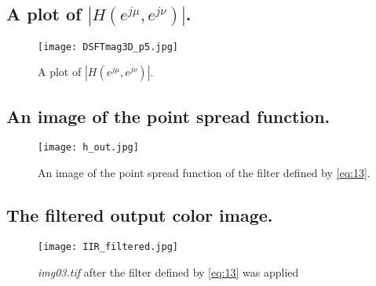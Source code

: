 \documentclass{article}
\begin{document}
\subsection{A plot of $|H(e^{j \mu}, e^{j \nu})|$.}
\begin{figure}[h]
    \centering
    \texttt{[image: DSFTmag3D\_p5.jpg]}
    \caption{A plot of $|H(e^{j \mu}, e^{j \nu})|$.}
    \label{fig:9}
\end{figure}
\newpage

\subsection{An image of the point spread function.}
\begin{figure}[h]
    \centering
    \texttt{[image: h\_out.jpg]}
    \caption{An image of the point spread function of the filter defined by \eqref{eq:13}.}
    \label{fig:9}
\end{figure}
\newpage
\subsection{The filtered output color image.}
\begin{figure}[h]
    \centering
    \texttt{[image: IIR\_filtered.jpg]}
    \caption{\textit{img03.tif} after the filter defined by \eqref{eq:13} was applied}
    \label{fig:10}
\end{figure}
\newpage
\end{document}
